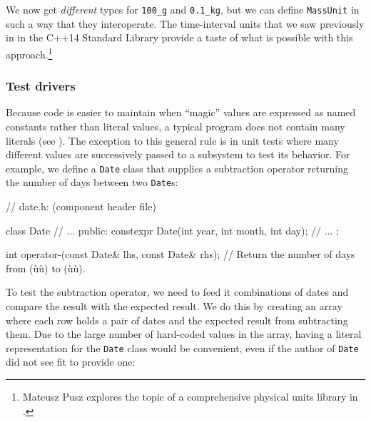 \noindent We now get \emph{different} types for \lstinline!100_g! and
\lstinline!0.1_kg!, but we can define \lstinline!MassUnit! in such a way that
they interoperate. The time-interval units that we saw previously in
{ in the C++14 Standard Library} provide a taste of what is
possible with this approach.{\cprotect\footnote{Mateusz Pusz explores
the topic of a comprehensive physical units library in \cite{pusz20b}.}}

\subsubsection[Test drivers]{Test drivers}\label{test-drivers}

Because code is easier to maintain when ``magic'' values are expressed
as named constants rather than literal values, a typical program does
not contain many literals (see ). The
exception to this general rule is in unit tests where many different values are
successively passed to a subsystem to test its behavior. For example, we define a \lstinline!Date! class
that supplies a subtraction operator returning the number of days
between two \lstinline!Date!s:

\begin{emcppslisting}[emcppsbatch=e21]
// date.h: (component header file)

class Date
{
    // ...
public:
    constexpr Date(int year, int month, int day);
    // ...
};

int operator-(const Date& lhs, const Date& rhs);
    // Return the number of days from (ù{}ù) to (ù{}ù).
\end{emcppslisting}

\noindent To test the subtraction operator, we need to feed it combinations of
dates and compare the result with the expected result. We do this by
creating an array where each row holds a pair of dates and the expected
result from subtracting them. Due to the large number of hard-coded
values in the array, having a literal representation for the
\lstinline!Date! class would be convenient, even if the author of
\lstinline!Date! did not see fit to provide one:

